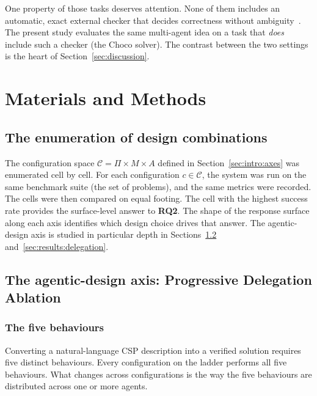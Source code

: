 \documentclass[11pt,a4paper]{article}
\newcommand{\rqtwo}{\textbf{RQ2}}
\begin{document}
One property of those tasks deserves attention. None of them includes an automatic, exact external checker that decides correctness without ambiguity~\cite{R8}. The present study evaluates the same multi-agent idea on a task that \emph{does} include such a checker (the Choco solver). The contrast between the two settings is the heart of Section~\ref{sec:discussion}.

\section{Materials and Methods}\label{sec:method}

\subsection{The enumeration of design combinations}\label{sec:method:config}
The configuration space $\mathcal{C} = \Pi \times M \times A$ defined in Section~\ref{sec:intro:axes} was enumerated cell by cell. For each configuration $c \in \mathcal{C}$, the system was run on the same benchmark suite (the set of problems), and the same metrics were recorded. The cells were then compared on equal footing. The cell with the highest success rate provides the surface-level answer to \rqtwo{}. The shape of the response surface along each axis identifies which design choice drives that answer. The agentic-design axis is studied in particular depth in Sections~\ref{sec:method:pda} and~\ref{sec:results:delegation}.

\subsection{The agentic-design axis: Progressive Delegation Ablation}\label{sec:method:pda}

\subsubsection{The five behaviours}\label{sec:method:pda:behaviours}
Converting a natural-language CSP description into a verified solution requires five distinct behaviours. Every configuration on the ladder performs all five behaviours. What changes across configurations is the way the five behaviours are distributed across one or more agents.
\end{document}
